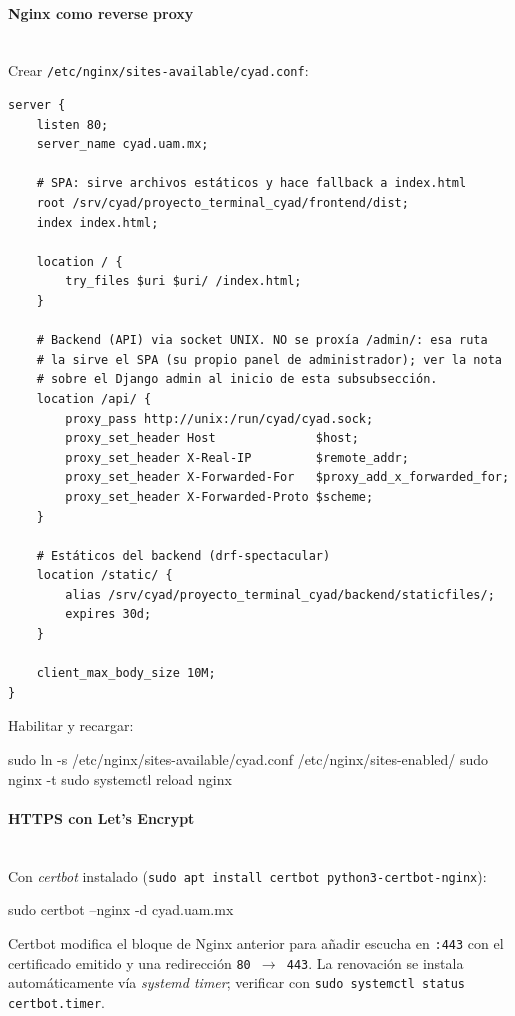 \paragraph{Nginx como reverse proxy}\mbox{}\\
Crear \texttt{/etc/nginx/sites-available/cyad.conf}:

\begin{lstlisting}[language=nginx]
server {
    listen 80;
    server_name cyad.uam.mx;

    # SPA: sirve archivos estáticos y hace fallback a index.html
    root /srv/cyad/proyecto_terminal_cyad/frontend/dist;
    index index.html;

    location / {
        try_files $uri $uri/ /index.html;
    }

    # Backend (API) via socket UNIX. NO se proxía /admin/: esa ruta
    # la sirve el SPA (su propio panel de administrador); ver la nota
    # sobre el Django admin al inicio de esta subsubsección.
    location /api/ {
        proxy_pass http://unix:/run/cyad/cyad.sock;
        proxy_set_header Host              $host;
        proxy_set_header X-Real-IP         $remote_addr;
        proxy_set_header X-Forwarded-For   $proxy_add_x_forwarded_for;
        proxy_set_header X-Forwarded-Proto $scheme;
    }

    # Estáticos del backend (drf-spectacular)
    location /static/ {
        alias /srv/cyad/proyecto_terminal_cyad/backend/staticfiles/;
        expires 30d;
    }

    client_max_body_size 10M;
}
\end{lstlisting}

Habilitar y recargar:

\begin{Comandos}
sudo ln -s /etc/nginx/sites-available/cyad.conf /etc/nginx/sites-enabled/
sudo nginx -t
sudo systemctl reload nginx
\end{Comandos}

\paragraph{HTTPS con Let's Encrypt}\mbox{}\\
Con \emph{certbot} instalado (\texttt{sudo apt install certbot python3-certbot-nginx}):

\begin{Comandos}
sudo certbot --nginx -d cyad.uam.mx
\end{Comandos}

Certbot modifica el bloque de Nginx anterior para añadir escucha en \texttt{:443} con el certificado emitido y una redirección \texttt{80 $\to$ 443}. La renovación se instala automáticamente vía \emph{systemd timer}; verificar con \texttt{sudo systemctl status certbot.timer}.

